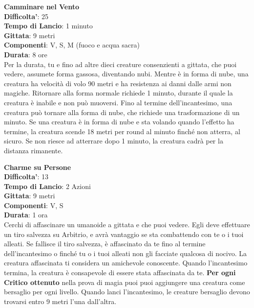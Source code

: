 \begin{multicols}{2}
\medskip\textbf{Camminare nel Vento}\\
\textbf{Difficolta'}: 25\\
\textbf{Tempo di Lancio}: 1 minuto\\
\textbf{Gittata}: 9 metri\\
\textbf{Componenti}: V, S, M (fuoco e acqua sacra)\\
\textbf{Durata}: 8 ore\\
Per la durata, tu e fino ad altre dieci creature consenzienti a gittata, che puoi vedere, assumete forma gassosa, diventando nubi. Mentre è in forma di nube, una creatura ha velocità di volo 90 metri e ha resistenza ai danni dalle armi non magiche. Ritornare alla forma normale richiede 1 minuto, durante il quale la creatura è inabile e non può muoversi. Fino al termine dell’incantesimo, una creatura può tornare alla forma di nube, che richiede una trasformazione di un minuto. Se una creatura è in forma di nube e sta volando quando l’effetto ha termine, la creatura scende 18 metri per round al minuto finché non atterra, al sicuro. Se non riesce ad atterrare dopo 1 minuto, la creatura cadrà per la distanza rimanente.

\medskip\textbf{Charme su Persone}\\
\textbf{Difficolta'}: 13\\
\textbf{Tempo di Lancio}: 2 Azioni\\
\textbf{Gittata}: 9 metri\\
\textbf{Componenti}: V, S\\
\textbf{Durata}: 1 ora\\
Cerchi di affascinare un umanoide a gittata e che puoi vedere. Egli deve effettuare un tiro salvezza su Arbitrio, e avrà vantaggio se sta combattendo con te o i tuoi alleati. Se fallisce il tiro salvezza, è affascinato da te fino al termine dell’incantesimo o finché tu o i tuoi alleati non gli facciate qualcosa di nocivo. La creatura affascinata ti considera un amichevole conoscente. Quando l’incantesimo termina, la creatura è consapevole di essere stata affascinata da te. 
\textbf{Per ogni Critico ottenuto} nella prova di magia puoi puoi aggiungere una creatura come bersaglio per ogni livello. Quando lanci l’incantesimo, le creature bersaglio devono trovarsi entro 9 metri l’una dall’altra.



\end{multicols}
